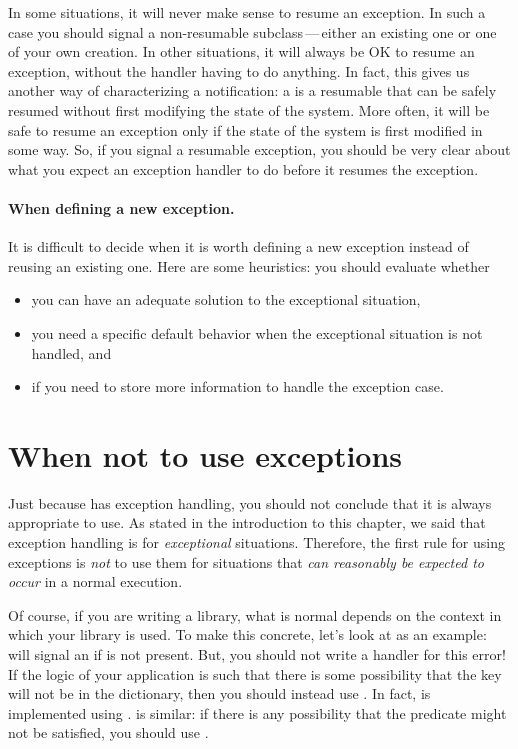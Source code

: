 In some situations, it will never make sense to resume an exception.
In such a case you should signal a non-resumable subclass\,---\,either an existing one or one of your own creation.
In other situations, it will always be OK to resume an exception, without the handler having to do anything.
In fact, this gives us another way of characterizing a notification:
a  is a resumable  that can be safely resumed without first modifying the state of the system.
More often, it will be safe to resume an exception only if the state of the system is first modified in some way.
So, if you signal a resumable exception, you should be very clear about what you expect an exception handler to do before it resumes the exception.

\paragraph{When defining a new exception.} It is  difficult  to decide when it is worth defining a new exception instead of reusing an existing one. Here are some heuristics: 
 you should evaluate whether 
\begin{itemize}
\item you can have an adequate solution to the exceptional situation, 
\item you need a specific default behavior when the exceptional situation is not handled, and  
\item if you need to store more information to handle the exception case. 
\end{itemize}

\section{When not to use exceptions}
Just because \pharo{} has exception handling, you should not conclude that it is always appropriate to use.  
As stated in the introduction to this chapter, we said that exception handling is for \emph{exceptional} situations.  
Therefore, the first rule for using exceptions is \emph{not} to use them for situations that \emph{can reasonably be expected to occur} in a normal execution. 

Of course, if you are writing a library, what is normal depends on the context in which your library is used.
To make this concrete, let's look at  as an example:
 will signal an  if  is not present.
But, you should not write a handler for this error!
If the logic of your application is such that there is some possibility that the key will not be in the dictionary, then you should instead use .
In fact,  is implemented using .
 is similar: if there is any possibility that the predicate might not be satisfied, you should use . 


